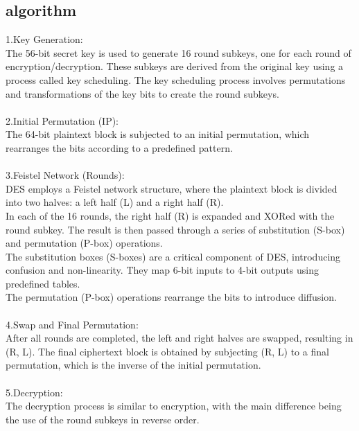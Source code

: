 \documentclass{report}
\begin{document}
\subsection{algorithm}
1.Key Generation:\\
The 56-bit secret key is used to generate 16 round subkeys, one for each round of encryption/decryption. These subkeys are derived from the original key using a process called key scheduling.
The key scheduling process involves permutations and transformations of the key bits to create the round subkeys.\\
\\
2.Initial Permutation (IP):\\
The 64-bit plaintext block is subjected to an initial permutation, which rearranges the bits according to a predefined pattern.\\
\\
3.Feistel Network (Rounds):\\
DES employs a Feistel network structure, where the plaintext block is divided into two halves: a left half (L) and a right half (R).\\
In each of the 16 rounds, the right half (R) is expanded and XORed with the round subkey. The result is then passed through a series of substitution (S-box) and permutation (P-box) operations.\\
The substitution boxes (S-boxes) are a critical component of DES, introducing confusion and non-linearity. They map 6-bit inputs to 4-bit outputs using predefined tables.\\
The permutation (P-box) operations rearrange the bits to introduce diffusion.\\
\\
4.Swap and Final Permutation:\\
After all rounds are completed, the left and right halves are swapped, resulting in (R, L).
The final ciphertext block is obtained by subjecting (R, L) to a final permutation, which is the inverse of the initial permutation.\\
\\
5.Decryption:\\
The decryption process is similar to encryption, with the main difference being the use of the round subkeys in reverse order.
\end{document}
